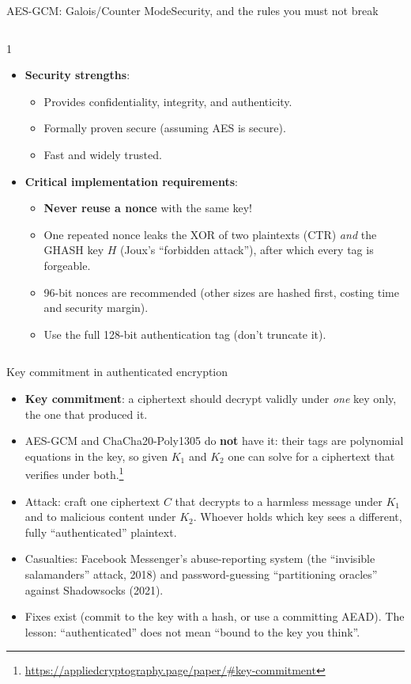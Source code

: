 \ifdefined\PRESENTATION\else\PassOptionsToClass{handout}{beamer}\fi\documentclass[aspectratio=169, lualatex]{beamer}
\begin{document}
\begin{frame}{AES-GCM: Galois/Counter Mode}{Security, and the rules you must not break}
	\begin{columns}[c]
		\begin{column}{1\textwidth}
			\begin{itemize}
				\item \textbf{Security strengths}:
				      \begin{itemize}
					      \item Provides confidentiality, integrity, and authenticity.
					      \item Formally proven secure (assuming AES is secure).
					      \item Fast and widely trusted.
				      \end{itemize}
				\item \textbf{Critical implementation requirements}:
				      \begin{itemize}
					      \item \textbf{Never reuse a nonce} with the same key!
					      \item One repeated nonce leaks the XOR of two plaintexts (CTR) \emph{and} the GHASH key $H$ (Joux's ``forbidden attack''), after which every tag is forgeable.
					      \item 96-bit nonces are recommended (other sizes are hashed first, costing time and security margin).
					      \item Use the full 128-bit authentication tag (don't truncate it).
				      \end{itemize}
			\end{itemize}
		\end{column}
	\end{columns}
\end{frame}

\begin{frame}{Key commitment in authenticated encryption}
	\begin{itemize}
		\item \textbf{Key commitment}: a ciphertext should decrypt validly under \emph{one} key only, the one that produced it.
		\item AES-GCM and ChaCha20-Poly1305 do \textbf{not} have it: their tags are polynomial equations in the key, so given $K_1$ and $K_2$ one can solve for a ciphertext that verifies under both.\footnote{\url{https://appliedcryptography.page/paper/\#key-commitment}}
		\item Attack: craft one ciphertext $C$ that decrypts to a harmless message under $K_1$ and to malicious content under $K_2$. Whoever holds which key sees a different, fully ``authenticated'' plaintext.
		\item Casualties: Facebook Messenger's abuse-reporting system (the ``invisible salamanders'' attack, 2018) and password-guessing ``partitioning oracles'' against Shadowsocks (2021).
		\item Fixes exist (commit to the key with a hash, or use a committing AEAD). The lesson: ``authenticated'' does not mean ``bound to the key you think''.
	\end{itemize}
\end{frame}
\end{document}
